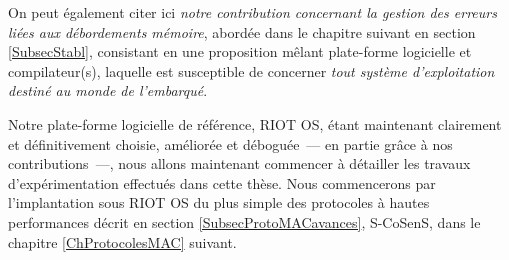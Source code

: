 On peut également citer ici \emph{notre contribution concernant
la gestion des erreurs liées aux débordements mémoire}, abordée dans
le chapitre suivant en section \vref{SubsecStabl}, consistant en
une proposition mêlant plate-forme logicielle et compilateur(s),
laquelle est susceptible de concerner \emph{tout système d'exploitation
destiné au monde de l'embarqué}.

\bigskip

Notre plate-forme logicielle de référence, RIOT OS, étant maintenant
clairement et définitivement choisie, améliorée et déboguée~--- en partie
grâce à nos contributions~---, nous allons maintenant commencer à détailler
les  travaux d'expérimentation effectués dans cette thèse. Nous commencerons
par l'implantation sous RIOT OS du plus simple des protocoles à hautes
performances décrit en section \vref{SubsecProtoMACavances}, S-CoSenS,
dans le chapitre \ref{ChProtocolesMAC} suivant.




